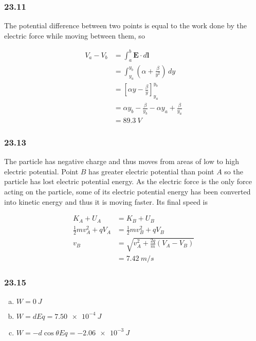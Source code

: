 \documentclass{article}
\begin{document}
\subsubsection{23.11}

The potential difference between two points is equal to the work done by the electric force while moving between them, so

\begin{align*}
  V_a - V_b & = \int_a^b \mathbf{E} \cdot d\mathbf{l}                           \\
            & = \int_{y_a}^{y_b} (\alpha + \frac{\beta}{y^2}) \,dy              \\
            & = \left[ \alpha y - \frac{\beta}{y} \right]_{y_a}^{y_b}           \\
            & = \alpha y_b - \frac{\beta}{y_b} - \alpha y_a + \frac{\beta}{y_a} \\
            & = \qty{89.3}{V}
\end{align*}

\subsubsection{23.13}

The particle has negative charge and thus moves from areas of low to high electric potential. Point $B$ has greater electric potential than point $A$ so the particle has lost electric potential energy. As the electric force is the only force acting on the particle, some of its electric potential energy has been converted into kinetic energy and thus it is moving faster. Its final speed is

\begin{align*}
  K_A + U_A                   & = K_B + U_B                                \\
  \frac{1}{2} m v_A^2 + q V_A & = \frac{1}{2} m v_B^2 + q V_B              \\
  v_B                         & = \sqrt{v_A^2 + \frac{2 q}{m} (V_A - V_B)} \\
                              & = \qty{7.42}{m/s}
\end{align*}

\subsubsection{23.15}

\begin{enumerate}[a)]
  \item $W = \qty{0}{J}$

  \item $W = d E q = \qty{7.50e-4}{J}$

  \item $W = -d \cos \theta E q = \qty{-2.06e-3}{J}$
\end{enumerate}
\end{document}
